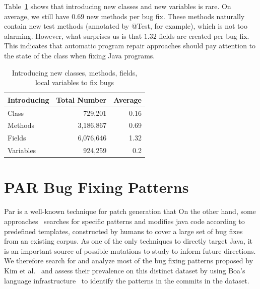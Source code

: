 \documentclass{sig-alternate-05-2015}
\newcommand{\todo}[1]
  {{\scriptsize \textbf{\color{red} {#1}}}}
\begin{document}
Table~\ref{tbl:new} shows that introducing new
classes and new variables is rare. On average, we still have $0.69$ new methods
per bug fix. These methods naturally contain new test methods (annotated by
@Test, for example), which is not too alarming. However,
what surprises us is that $1.32$ fields are created per bug fix.  This indicates
that automatic program repair approaches should pay attention to the state of
the class when fixing Java programs.

\begin{table}
\centering
  \begin{tabular}{l | r  r }
  \toprule
  Introducing & Total Number & Average \\ \midrule
  Class & 729,201 & 0.16 \\ 
  Methods & 3,186,867 & 0.69 \\ 
  Fields & 6,076,646 & 1.32 \\ 
  Variables & 924,259 & 0.2 \\ 
  \end{tabular}
  \caption{Introducing new classes, methods, fields, local variables to fix bugs}
  \label{tbl:new}
\end{table}


\section{PAR Bug Fixing Patterns}\label{sec:method}

Par is a well-known technique for patch generation that 
On the other hand, some approaches~\cite{kim2013} searches for specific patterns
and modifies java code according to predefined templates, constructed by humans
to cover a large set of bug fixes from an existing corpus.  As one of the only
techniques to directly target Java, it is an important source of possible
mutations to study to inform future directions. 
We therefore search for and analyze most of the bug fixing patterns proposed by
Kim et al.~\cite{kim2013} and assess their prevalence on this distinct
dataset by using Boa's language infrastructure~\cite{dyer2013} to identify the patterns
in the commits in the dataset.

\end{document}
